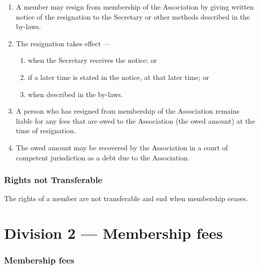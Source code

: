 \begin{enumerate}

\item A member may resign from membership of the Association by giving written notice of the resignation to the Secretary or other methods described in the by-laws.
\item The resignation takes effect ---

  \begin{enumerate}
  
  \item when the Secretary receives the notice; or
  \item if a later time is stated in the notice, at that later time; or
  \item when described in the by-laws.
  \end{enumerate}
\item A person who has resigned from membership of the Association remains liable for any fees that are owed to the Association (the owed amount) at the time of resignation.
\item The owed amount may be recovered by the Association in a court of competent jurisdiction as a debt due to the Association.
\end{enumerate}

\hypertarget{rights-not-transferable}{%
\section{Rights not Transferable}\label{rights-not-transferable}}

The rights of a member are not transferable and end when membership ceases.

\hypertarget{division-2-membership-fees}{%
\part*{Division 2 --- Membership fees}\label{division-2-membership-fees}}

\hypertarget{membership-fees}{%
\section{Membership fees}\label{membership-fees}}

